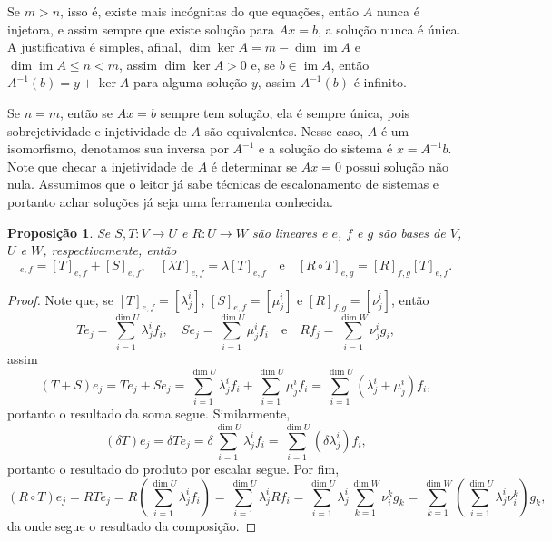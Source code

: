 \documentclass{article}
\newtheorem{proposition}[definition]{Proposição}
\DeclareMathOperator{\im}{im}
\begin{document}
Se $m > n$, isso é, existe mais incógnitas do que equações, então $A$ nunca é injetora, e assim sempre que existe solução para $Ax = b$, a solução nunca é única. A justificativa é simples, afinal, $\dim \ker A = m - \dim \im A$ e $\dim \im A \leq n < m$, assim $\dim \ker A > 0$ e, se $b \in \im A$, então $A^{-1}(b) = y + \ker A$ para alguma solução $y$, assim $A^{-1}(b)$ é infinito.

Se $n = m$, então se $Ax = b$ sempre tem solução, ela é sempre única, pois sobrejetividade e injetividade de $A$ são equivalentes. Nesse caso, $A$ é um isomorfismo, denotamos sua inversa por $A^{-1}$ e a solução do sistema é $x = A^{-1}b$. Note que checar a injetividade de $A$ é determinar se $Ax = 0$ possui solução não nula. Assumimos que o leitor já sabe técnicas de escalonamento de sistemas e portanto achar soluções já seja uma ferramenta conhecida.

\begin{proposition}
    Se $S, T \colon V \to U$ e $R \colon U \to W$ são lineares e $e$, $f$ e $g$ são bases de $V$, $U$ e $W$, respectivamente, então \begin{equation}
        [T + S]_{e, f} = [T]_{e, f} + [S]_{e, f}, \quad [\lambda T]_{e, f} = \lambda [T]_{e, f} \quad \text{e} \quad [R \circ T]_{e, g} = [R]_{f,g} [T]_{e,f}.
    \end{equation}
\end{proposition}
\begin{proof}
    Note que, se $[T]_{e,f} = [\lambda^i_j]$, $[S]_{e,f} = [\mu^i_j]$ e $[R]_{f,g} = [\nu^i_j]$, então \begin{equation}
        Te_j = \sum_{i = 1}^{\dim U} \lambda^i_j f_i, \quad Se_j = \sum_{i = 1}^{\dim U} \mu^i_j f_i \quad \text{e} \quad Rf_j = \sum_{i = 1}^{\dim W} \nu^i_j g_i,
    \end{equation} assim \begin{equation}
        (T + S)e_j = Te_j + Se_j = \sum_{i = 1}^{\dim U} \lambda^i_j f_i + \sum_{i = 1}^{\dim U} \mu^i_j f_i = \sum_{i = 1}^{\dim U} (\lambda^i_j + \mu^i_j) f_i,
    \end{equation} portanto o resultado da soma segue. Similarmente, \begin{equation}
        (\delta T)e_j = \delta Te_j = \delta \sum_{i = 1}^{\dim U} \lambda^i_j f_i = \sum_{i = 1}^{\dim U} (\delta \lambda^i_j) f_i,
    \end{equation} portanto o resultado do produto por escalar segue. Por fim, \begin{equation}
        (R \circ T)e_j = RTe_j = R\left(\sum_{i = 1}^{\dim U} \lambda^i_j f_i\right) = \sum_{i = 1}^{\dim U} \lambda^i_j Rf_i = \sum_{i = 1}^{\dim U} \lambda^i_j \sum_{k = 1}^{\dim W} \nu^k_i g_k = \sum_{k = 1}^{\dim W} \left(\sum_{i = 1}^{\dim U} \lambda^i_j \nu^k_i\right) g_k,
    \end{equation} da onde segue o resultado da composição.
\end{proof}
\end{document}
